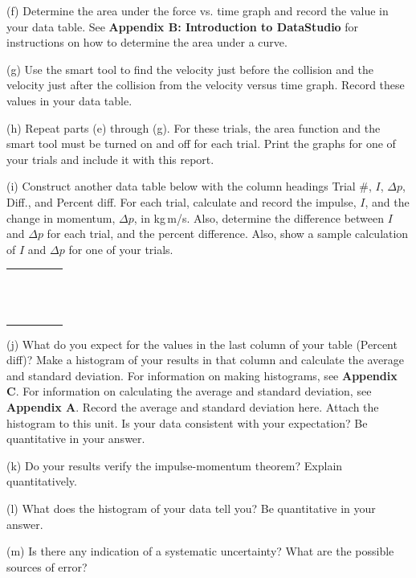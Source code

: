 (f) Determine the area under the force vs. time graph and record the value in
your data table. See \textbf{Appendix B: Introduction to DataStudio} for instructions on how to determine the area under a curve.

(g) Use the smart tool to find the velocity just before the collision and the
velocity just after the collision from the velocity versus time graph. Record
these values in your data table.

(h) Repeat parts (e) through (g). For these trials, 
the area function and the smart tool must be turned on and off for each trial. 
Print the graphs for one of your trials and include it with this report.

\newpage

(i) Construct another data table below with the column headings
Trial \#, $I$, \( \Delta  p\), Diff., and Percent diff. For each trial, calculate and record
the impulse, $I$, and the change in momentum, \( \Delta  p\), in kg\,m/s. Also,
determine the difference between $I$ and $\Delta p$  for each trial, and the percent difference. Also, show a sample
calculation of $I$ and \( \Delta  p\) for one of your trials.

\begin{center}
\begin{tabular}{|p{1.0in}|p{1.0in}|p{1.0in}|p{1.0in}|p{1.0in}|} \hline
 & & & & \\ \hline
 & & & & \\
 & & & & \\
 & & & & \\
 & & & & \\
 & & & & \\
 & & & & \\
 & & & & \\
 & & & & \\
 & & & & \\
 & & & & \\
 & & & & \\
 & & & & \\
 & & & & \\ \hline
\end{tabular}
\end{center}

(j) What do you expect for the values in the last column of your table (Percent diff)? Make a histogram of your results in that column and calculate the average and standard deviation. For information on making histograms, see \textbf{Appendix C}. For information on calculating the average and standard deviation, see \textbf{Appendix A}. Record the average and standard deviation here.
Attach the histogram to this unit.
Is your data consistent with your expectation?  Be quantitative in your answer.
\vspace{20mm}

(k) Do your results verify the impulse-momentum theorem? Explain quantitatively.
\vspace{20mm}

(l) What does the histogram of your data tell you? Be quantitative in your answer.
\vspace{20mm}

(m) Is there any indication of a systematic uncertainty? What are the possible
sources of error?

